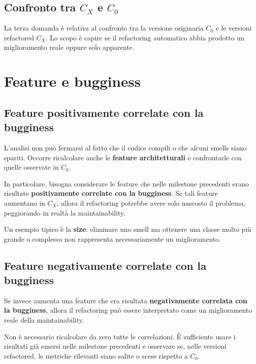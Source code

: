 \subsection{Confronto tra \(C_X\) e \(C_0\)}

La terza domanda è relativa al confronto tra la versione originaria \(C_0\) e le versioni refactored \(C_X\). Lo scopo è capire se il refactoring automatico abbia prodotto un miglioramento reale oppure solo apparente.

\section{Feature e bugginess}

\subsection{Feature positivamente correlate con la bugginess}

L'analisi non può fermarsi al fatto che il codice compili o che alcuni smells siano spariti. Occorre ricalcolare anche le \textbf{feature architetturali} e confrontarle con quelle osservate in \(C_0\).

In particolare, bisogna considerare le feature che nelle milestone precedenti erano risultate \textbf{positivamente correlate con la bugginess}. Se tali feature aumentano in \(C_X\), allora il refactoring potrebbe avere solo nascosto il problema, peggiorando in realtà la maintainability.

Un esempio tipico è la \textbf{size}: eliminare uno smell ma ottenere una classe molto più grande o complessa non rappresenta necessariamente un miglioramento.

\subsection{Feature negativamente correlate con la bugginess}

Se invece aumenta una feature che era risultata \textbf{negativamente correlata con la bugginess}, allora il refactoring può essere interpretato come un miglioramento reale della maintainability.

\begin{notaprof}
Non è necessario ricalcolare da zero tutte le correlazioni. È sufficiente usare i risultati già emersi nelle milestone precedenti e osservare se, nelle versioni refactored, le metriche rilevanti siano salite o scese rispetto a \(C_0\).
\end{notaprof}

